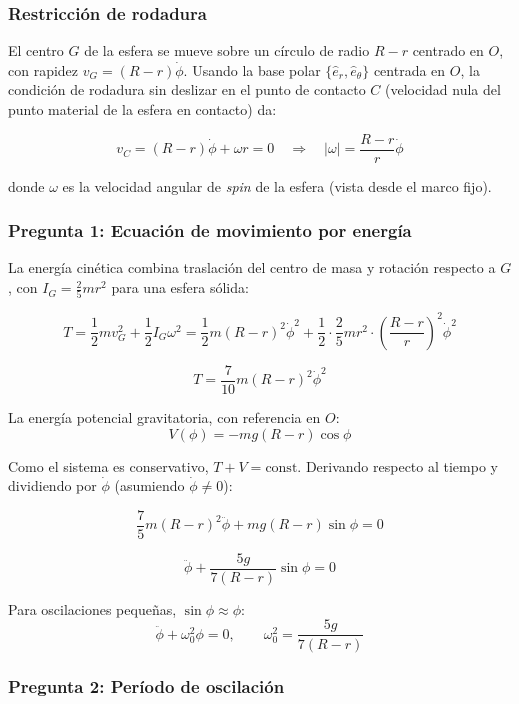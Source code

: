 \begin{sol}

\subsubsection*{Restricción de rodadura}

El centro $G$ de la esfera se mueve sobre un círculo de radio $R-r$ centrado en $O$, con rapidez $v_G = (R-r)\dot\phi$. Usando la base polar $\{\hat{e}_r,\hat{e}_\theta\}$ centrada en $O$, la condición de rodadura sin deslizar en el punto de contacto $C$ (velocidad nula del punto material de la esfera en contacto) da:

$$v_C = (R-r)\dot\phi + \omega r = 0 \quad\Rightarrow\quad |\omega| = \frac{R-r}{r}\dot\phi$$

donde $\omega$ es la velocidad angular de \emph{spin} de la esfera (vista desde el marco fijo).

\subsubsection*{Pregunta 1: Ecuación de movimiento por energía}

La energía cinética combina traslación del centro de masa y rotación respecto a $G$, con $I_G = \frac{2}{5}mr^2$ para una esfera sólida:

$$T = \frac{1}{2}mv_G^2 + \frac{1}{2}I_G\omega^2 = \frac{1}{2}m(R-r)^2\dot\phi^2 + \frac{1}{2}\cdot\frac{2}{5}mr^2\cdot\left(\frac{R-r}{r}\right)^2\dot\phi^2$$

$$T = \frac{7}{10}m(R-r)^2\dot\phi^2$$

La energía potencial gravitatoria, con referencia en $O$:
$$V(\phi) = -mg(R-r)\cos\phi$$

Como el sistema es conservativo, $T + V = \text{const.}$ Derivando respecto al tiempo y dividiendo por $\dot\phi$ (asumiendo $\dot\phi \neq 0$):

$$\frac{7}{5}m(R-r)^2\ddot\phi + mg(R-r)\sin\phi = 0$$

$$\boxed{\ddot\phi + \frac{5g}{7(R-r)}\sin\phi = 0}$$

Para oscilaciones pequeñas, $\sin\phi \approx \phi$:
$$\ddot\phi + \omega_0^2\phi = 0, \qquad \omega_0^2 = \frac{5g}{7(R-r)}$$

\subsubsection*{Pregunta 2: Período de oscilación}


\end{sol}
